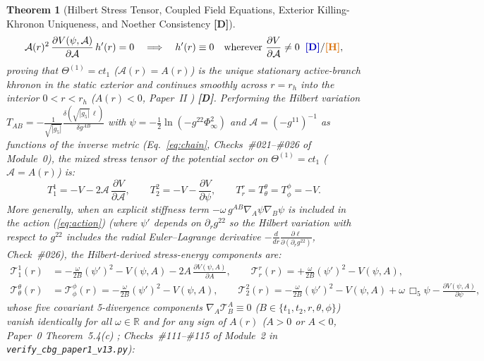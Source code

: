 \documentclass[11pt,a4paper]{article}
\newcommand{\catD}{\textbf{\textcolor{blue!75!black}{[D]}}}
\newcommand{\catH}{\textbf{\textcolor{orange!85!black}{[H]}}}
\newtheorem{theorem}{Theorem}[section]
\theoremstyle{definition}
\theoremstyle{remark}
\begin{document}
\begin{theorem}[Hilbert Stress Tensor, Coupled Field Equations, Exterior Killing-Khronon Uniqueness, and Noether Consistency \catD]
\begin{equation}
  \mathcal{A}(r)^2\,\frac{\partial V(\psi,\mathcal{A})}{\partial\mathcal{A}}\,h'(r) = 0 \quad \Longrightarrow \quad h'(r) \equiv 0 \quad \text{wherever } \frac{\partial V}{\partial\mathcal{A}} \neq 0 \;\;\catD/\catH,
  \label{eq:khronon_exterior_uniqueness}
\end{equation}
proving that $\Theta^{(1)} = c t_1$ ($\mathcal{A}(r) = A(r)$) is the unique stationary active-branch khronon in the static exterior and continues smoothly across $r = r_h$ into the interior $0 < r < r_h$ ($A(r) < 0$, \textit{Paper~II} \cite{JV_Paper2}) \catD. Performing the Hilbert variation $T_{AB} = -\frac{1}{\sqrt{|g_5|}}\frac{\delta(\sqrt{|g_5|}\,\ell)}{\delta g^{AB}}$ with $\psi = -\frac{1}{2}\ln(-g^{22}\Phi_\infty^2)$ and $\mathcal{A} = (-g^{11})^{-1}$ as functions of the inverse metric (Eq.~\ref{eq:chain}, Checks~\#021--\#026 of Module~0), the mixed stress tensor of the potential sector on $\Theta^{(1)} = c t_1$ ($\mathcal{A} = A(r)$) is:
\begin{equation}
  T^1_1 = -V - 2\mathcal{A}\,\frac{\partial V}{\partial\mathcal{A}}, \qquad
  T^2_2 = -V - \frac{\partial V}{\partial\psi}, \qquad
  T^r_r = T^{\theta}_{\theta} = T^{\phi}_{\phi} = -V.
  \label{eq:T}
\end{equation}
More generally, when an explicit stiffness term $-\omega\,g^{AB}\nabla_A\psi\nabla_B\psi$ is included in the action (\ref{eq:action}) (where $\psi'$ depends on $\partial_r g^{22}$ so the Hilbert variation with respect to $g^{22}$ includes the radial Euler--Lagrange derivative $-\frac{d}{dr}\frac{\partial\ell}{\partial(\partial_r g^{22})}$, Check~\#026), the Hilbert-derived stress-energy components are:
\begin{align}
  \mathcal{T}^1_1(r) &= -\frac{\omega}{2 B}(\psi')^2 - V(\psi,A) - 2 A\,\frac{\partial V(\psi,A)}{\partial A}, \qquad
  \mathcal{T}^r_r(r) = +\frac{\omega}{2 B}(\psi')^2 - V(\psi,A), \label{eq:exact_T11_Trr} \\[4pt]
  \mathcal{T}^{\theta}_{\theta}(r) &= \mathcal{T}^{\phi}_{\phi}(r) = -\frac{\omega}{2 B}(\psi')^2 - V(\psi,A), \qquad
  \mathcal{T}^2_2(r) = -\frac{\omega}{2 B}(\psi')^2 - V(\psi,A) + \omega\,\Box_5\psi - \frac{\partial V(\psi,A)}{\partial\psi}, \label{eq:exact_Tthth_T22}
\end{align}
whose five covariant 5-divergence components $\nabla_A\mathcal{T}^A_B \equiv 0$ ($B \in \{t_1, t_2, r, \theta, \phi\}$) vanish identically for all $\omega \in \mathbb{R}$ and for any sign of $A(r)$ ($A > 0$ or $A < 0$, Paper~0 Theorem~5.4(c) \cite{JV_Paper0}; Checks~\#111--\#115 of Module~2 in \allowbreak\texttt{verify\_cbg\_paper1\_v13.py}):

\end{theorem}
\end{document}
